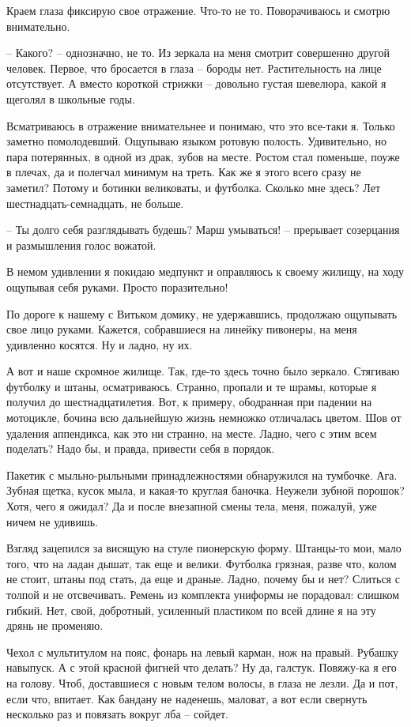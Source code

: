 \documentclass[a4paper]{book}
\begin{document}
Краем глаза фиксирую свое отражение. Что-то не то. Поворачиваюсь и смотрю внимательно. 

-- Какого? -- однозначно, не то. Из зеркала на меня смотрит совершенно другой человек. Первое, что бросается в глаза -- бороды нет. Растительность на лице отсутствует. А вместо короткой стрижки -- довольно густая шевелюра, какой я щеголял в школьные годы.

Всматриваюсь в отражение внимательнее и понимаю, что это все-таки я. Только заметно помолодевший. Ощупываю языком ротовую полость. Удивительно, но пара потерянных, в одной из драк, зубов на месте. Ростом стал поменьше, поуже в плечах, да и полегчал минимум на треть. Как же я этого всего сразу не заметил? Потому и ботинки великоваты, и футболка. Сколько мне здесь? Лет шестнадцать-семнадцать, не больше.

-- Ты долго себя разглядывать будешь? Марш умываться! -- прерывает созерцания и размышления голос вожатой.

В немом удивлении я покидаю медпункт и оправляюсь к своему жилищу, на ходу ощупывая себя руками. Просто поразительно!

По дороге к нашему с Витьком домику, не удержавшись, продолжаю ощупывать свое лицо руками. Кажется, собравшиеся на линейку пивонеры, на меня удивленно косятся. Ну и ладно, ну их.

А вот и наше скромное жилище. Так, где-то здесь точно было зеркало. Стягиваю футболку и штаны, осматриваюсь. Странно, пропали и те шрамы, которые я получил до шестнадцатилетия. Вот, к примеру, ободранная при падении на мотоцикле, бочина всю дальнейшую жизнь немножко отличалась цветом. Шов от удаления аппендикса, как это ни странно, на месте. Ладно, чего с этим всем поделать? Надо бы, и правда, привести себя в порядок. 

Пакетик с мыльно-рыльными принадлежностями обнаружился на тумбочке. Ага. Зубная щетка, кусок мыла, и какая-то круглая баночка. Неужели зубной порошок? Хотя, чего я ожидал? Да и после внезапной смены тела, меня, пожалуй, уже ничем не удивишь. 

Взгляд зацепился за висящую на стуле пионерскую форму. Штанцы-то мои, мало того, что на ладан дышат, так еще и велики. Футболка грязная, разве что, колом не стоит, штаны под стать, да еще и драные. Ладно, почему бы и нет? Слиться с толпой и не отсвечивать. Ремень из комплекта униформы не порадовал: слишком гибкий. Нет, свой, добротный, усиленный пластиком по всей длине я на эту дрянь не променяю. 

Чехол с мультитулом на пояс, фонарь на левый карман, нож на правый. Рубашку навыпуск. А с этой красной фигней что делать? Ну да, галстук. Повяжу-ка я его на голову. Чтоб, доставшиеся с новым телом волосы, в глаза не лезли. Да и пот, если что, впитает. Как бандану не наденешь, маловат, а вот если свернуть несколько раз и повязать вокруг лба -- сойдет. 
\end{document}
